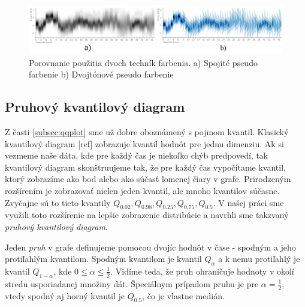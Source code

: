 \begin{figure}
	\centering
	\hspace*{-0.8in}
	\includegraphics[width = 7.5in]{densitycompare}
	\caption{Porovnanie použitia dvoch techník farbenia. a) Spojité pseudo farbenie b) Dvojtónové pseudo farbenie }
	\label{fig:densitycompare} 
\end{figure}

\subsection{Pruhový kvantilový diagram} 
Z časti \ref{subsec:qqplot} sme už dobre oboznámený s pojmom kvantil. Klasický kvantilový diagram [ref] zobrazuje kvantil hodnôt pre jednu dimenziu. Ak si vezmeme naše dáta, kde pre každý čas je niekoľko chýb predpovedí, tak kvantilový diagram skonštruujeme tak, že pre každý čas vypočítame kvantil, ktorý zobrazíme ako bod alebo ako súčasť lomenej čiary v grafe.
Prirodzeným rozšírením je zobrazovať nielen jeden kvantil, ale mnoho kvantilov súčasne. Zvyčajne sú to tieto kvantily $ Q_{0.02}, Q_{0.98}, Q_{0.25}, Q_{0.75}, Q_{0.5} $. V našej práci sme využili toto rozšírenie na lepšie zobrazenie distribúcie a navrhli sme takzvaný \textit{pruhový kvantilový diagram}.

Jeden \textit{pruh} v grafe definujeme pomocou dvojíc hodnôt v čase - spodným a jeho protiľahlým kvantilom. Spodným kvantilom je kvantil $ Q_{\alpha} $ a k nemu protiľahlý je kvantil $ Q_{1 - \alpha} $, kde $ 0 \leq \alpha \leq \frac{1}{2} $. Vidíme teda, že pruh ohraničuje hodnoty v okolí stredu usporiadanej množiny dát. Špeciálnym prípadom pruhu je pre $ \alpha = \frac{1}{2} $, vtedy spodný aj horný kvantil je $ Q_{0.5} $, čo je vlastne medián.

